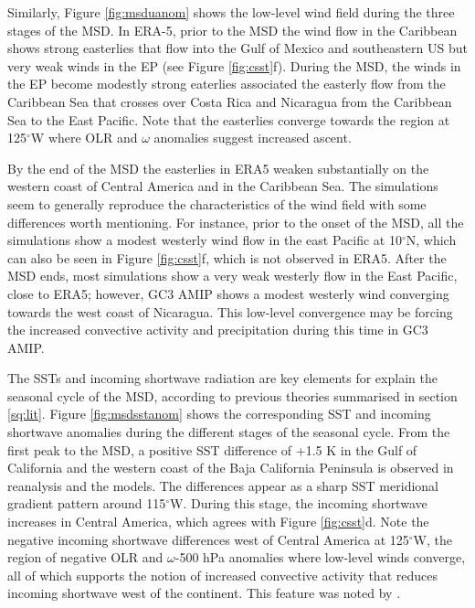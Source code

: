  

Similarly, Figure \ref{fig:msduanom} shows the low-level wind field during the three stages of the MSD. In ERA-5, prior to the MSD the wind flow in the Caribbean shows strong easterlies that flow into the Gulf of Mexico and southeastern US but very weak winds in the EP (see Figure \ref{fig:csst}f). During the MSD, the winds in the EP become modestly strong eaterlies associated the easterly flow from the Caribbean Sea that crosses over Costa Rica and Nicaragua from the Caribbean Sea to the East Pacific. Note that the easterlies converge towards the region at 125$^\circ$W where OLR and $\omega$ anomalies suggest increased ascent. 

By the end of the MSD the easterlies in ERA5 weaken substantially on the western coast of Central America and in the Caribbean Sea.
The simulations seem to generally reproduce the characteristics of the wind field with some differences worth mentioning. For instance, prior to the onset of the MSD, all the simulations show a modest westerly wind flow in the east Pacific at 10$^\circ$N, which can also be seen in Figure \ref{fig:csst}f, which is not observed in ERA5.
After the MSD ends, most simulations show a very weak westerly flow in the East Pacific, close to ERA5; however, GC3 AMIP shows a modest westerly wind converging towards the west coast of Nicaragua. This low-level convergence may be forcing the increased convective activity and precipitation during this time in GC3 AMIP.

The SSTs and incoming shortwave radiation are key elements for explain the seasonal cycle of the MSD, according to previous theories summarised in section \ref{sq:lit}. 
Figure \ref{fig:msdsstanom} shows the corresponding SST and incoming shortwave anomalies during the different stages of the seasonal cycle. %
From the first peak to the MSD, a positive SST difference of +1.5 K in the Gulf of California and the western coast of the Baja California Peninsula is observed in reanalysis and the models. The differences appear as a sharp SST meridional gradient pattern around 115$^\circ$W. 
During this stage, the incoming shortwave increases in Central America, which agrees with Figure \ref{fig:csst}d. 
Note the negative incoming shortwave differences west of Central America at 125$^\circ$W, the region of negative OLR and $\omega$-500 hPa anomalies where low-level winds converge, all of which supports the notion of increased convective activity that reduces incoming shortwave west of the continent. This feature was noted by \cite{herrera2015}. 


